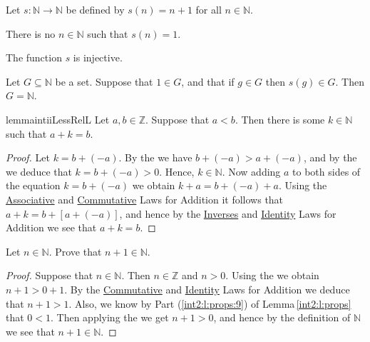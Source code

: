 \begin{theorem} %
	\label{int2:t:peano}
	Let $s: \mathbb{N} \to \mathbb{N}$ be defined by $s(n) = n + 1$ for all $n \in \mathbb{N}$.
	\begin{lenumerate}
		\item There is no $n \in \mathbb{N}$ such that $s(n) = 1$.
		\item The function $s$ is injective.
		\item Let $G \subseteq \mathbb{N}$ be a set. Suppose that $1 \in G$, and that if $g \in G$ then $s(g) \in G$. Then
		      $G = \mathbb{N}$. \label{int2:t:peano:induction}
	\end{lenumerate}
\end{theorem}


\Newpage
\begin{restatable}{lemma}{intiiLessRelL} %
	\label{int2:l:less_relation}
	Let $a, b \in \mathbb{Z}$. Suppose that $a < b$. Then there is some $k \in \mathbb{N}$ such that $a + k = b$.
\end{restatable}

\begin{proof}
	Let $k = b + (-a)$. By the  we have ${b + (-a) > a + (-a)}$, and by the  we deduce that $k = b + (-a) > 0$. Hence, $k \in \mathbb{N}$. Now adding $a$ to both sides of the equation $k = b + (-a)$ we obtain $k + a = b + (-a) + a$. Using the \hyperref[int2:d:oid:associative_add]{Associative} and \hyperref[int2:d:oid:commutative_add]{Commutative} Laws for Addition it follows that $a + k = b + [a + (-a)]$, and hence by the \hyperref[int2:d:oid:inverses_add]{Inverses} and \hyperref[int2:d:oid:identity_add]{Identity} Laws for Addition we see that $a + k = b$.
\end{proof}


\addtocounter{exercise}{1}
\Newpage
\begin{exercise} %
	Let $n \in \mathbb{N}$. Prove that $n + 1 \in \mathbb{N}$.
\end{exercise}

\begin{proof}
	Suppose that $n \in \mathbb{N}$. Then $n \in \mathbb{Z}$ and $n > 0$. Using the  we obtain $n + 1 > 0 + 1$. By the \hyperref[int2:d:oid:commutative_add]{Commutative} and \hyperref[int2:d:oid:identity_add]{Identity} Laws for Addition we deduce that $n + 1 > 1$. Also, we know by Part (\ref{int2:l:props:9}) of Lemma\,\ref{int2:l:props} that $0 < 1$. Then applying the  we get $n + 1 > 0$, and hence by the definition of $\mathbb{N}$ we see that $n + 1 \in \mathbb{N}$.
\end{proof}


